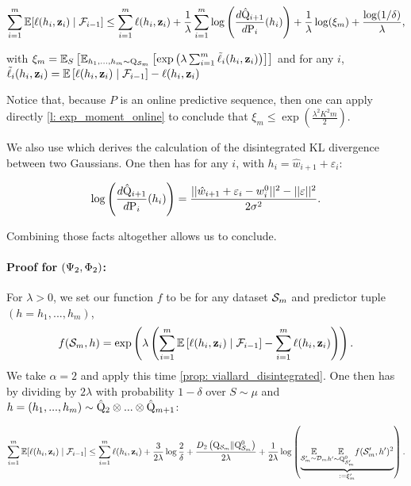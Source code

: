 \[ \sum_{i=1}^m  \mathbb{E}[\ell(h_i,\mathbf{z}_i) \mid \mathcal{F}_{i-1}]   \leq \sum_{i=1}^m  \ell(h_i,\mathbf{z}_i)  + \frac{1}{\lambda}\sum_{i=1}^m \log\left(\frac{d\hat{\mathrm{Q}}_{i+1}}{d\mathrm{P}_{i}}(h_i)\right) + \frac{1}{\lambda} \log(\xi_m) + \frac{\log(1/\delta)}{\lambda}, \]

with $  \xi_m = \mathbb{E}_S\left[\mathbb{E}_{h_1,...,h_m \sim \mathrm{Q}_{\mathcal{S}_m}} \left[\exp\left(\lambda \sum_{i=1}^m \Tilde{\ell}_i(h_i,\mathbf{z}_i)\right)\right]\right]$ and for any $i$,
$ \Tilde{\ell}_i(h_i,\mathbf{z}_i) = \mathbb{E}\left[\ell(h_i,\mathbf{z}_i)\mid \mathcal{F}_{i-1}\right]-  \ell(h_i,\mathbf{z}_i) $

Notice that, because $P$ is an online predictive sequence, then one can apply directly \cref{l: exp_moment_online} to conclude that $\xi_m \leq \exp \left( \frac{\lambda^2K^2m}{2} \right)$.

We also use \cite[Lemma 11]{viallard2023general} which derives the calculation of the disintegrated KL divergence between two Gaussians. One then has for any $i$, with $h_i= \hat{w}_{i+1} + \varepsilon_i$:

\[ \log\left(\frac{d\hat{\mathrm{Q}}_{i+1}}{d\mathrm{P}_{i}}(h_i)\right) = \frac{||\hat{w}_{i+1} + \varepsilon_i- w_i^0||^2 - ||\varepsilon||^2}{2\sigma^2}. \]

Combining those facts altogether allows us to conclude.


\paragraph{Proof for  $(\Psi_{\normalfont2},\Phi_{\normalfont2})$:}

For $\lambda>0$, we set our function $f$ to be for any dataset $\mathcal{S}_m$ and predictor tuple $(h=h_1,...,h_m)$,
\[f(\mathcal{S}_m,h) = \exp\left(\lambda \left(\sum_{i=1}^m \mathbb{E}\left[\ell(h_i,\mathbf{z}_i)\mid \mathcal{F}_{i-1}\right]- \sum_{i=1}^m \ell(h_i,\mathbf{z}_i) \right) \right).\]
We take $\alpha=2$ and apply this time \cref{prop: viallard_disintegrated}.
One then has by dividing by $2\lambda$ with probability $1-\delta$ over $S\sim \mu$ and $h=(h_1,...,h_m)\sim \hat{\mathrm{Q}}_2\otimes ... \otimes \hat{\mathrm{Q}}_{m+1}$:

\[\sum_{i=1}^m  \mathbb{E}[\ell(h_i,\mathbf{z}_i) \mid \mathcal{F}_{i-1}]   \leq \sum_{i=1}^m  \ell(h_i,\mathbf{z}_i)+   \frac{3}{2\lambda}\log \frac{2}{\delta}+\frac{D_{2}\left(\mathrm{Q}_{\mathcal{S}_m} \| \mathrm{Q}_{\mathcal{S}_m}^0\right)}{2\lambda}+ \frac{1}{2\lambda}
\log \left(\underbrace{\underset{\mathcal{S}_m^{\prime} \sim \mathcal{D}_{m}}{\mathbb{E}} \underset{h^{\prime} \sim \mathrm{Q}_{\mathcal{S}_m'}^0}{\mathbb{E}}
f(\mathcal{S}_m',h')^{2}}_{:= \xi_m'}\right). \]

